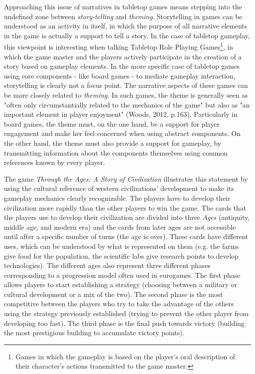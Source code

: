 Approaching this issue of narratives in tabletop games means stepping into the undefined zone between \textit{story-telling} and \textit{theming}. Storytelling in games can be understood as an activity in itself, in which the purpose of all narrative elements in the game is actually a support to tell a story. In the case of tabletop gameplay, this viewpoint is interesting when talking Tabletop Role Playing Games\footnote{Games in which the gameplay is based on the player's oral description of their character's actions transmitted to the game master.}, in which the game master and the players actively participate in the creation of a story based on gameplay elements. In the more specific case of tabletop games using core components - like board games - to mediate gameplay interaction, storytelling is clearly not a focus point. The narrative aspects of these games can be more closely related to \textit{theming}. In such games, the theme is generally seen as "often only circumstantially related to the mechanics of the game" but also as "an important element in player enjoyment" (Woods, 2012, p.163). Particularly in board games, the theme must, on the one hand, be a support for player engagement and make her feel concerned when using abstract components. On the other hand, the theme must also provide a support for gameplay, by transmitting information about the components themselves using common references known by every player.

The game \textit{{Through the Ages: A Story of Civilization}}\cite{game:ages} illustrates this statement by using the cultural reference of western civilizations' development to make its gameplay mechanics clearly recognizable. The players have to develop their civilization more rapidly than the other players to win the game. The cards that the players use to develop their civilization are divided into three \textit{Ages} (antiquity, middle age, and modern era) and the cards from later ages are not accessible until after a specific number of turns (the age is over). These cards have different uses, which can be understood by what is represented on them (e.g. the farms give food for the population, the scientific labs give research points to develop technologies). The different ages also represent three different phases corresponding to a progression model often used in eurogames. The first phase allows players to start establishing a strategy (choosing between a military or cultural development or a mix of the two). The second phase is the most competitive between the players who try to take the advantage of the others using the strategy previously established (trying to prevent the other player from developing too fast). The third phase is the final push towards victory (building the most prestigious building to accumulate victory points).

